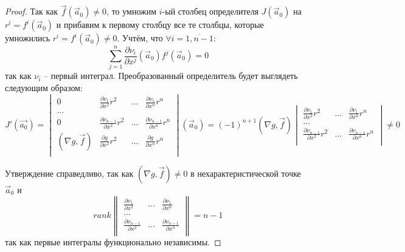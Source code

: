 \begin{proof}
    Так как $\vec{f} \left( \vec{a}_0 \right) \neq 0$, то умножим $i$-ый столбец определителя $J \left( \vec{a}_0 \right)$ на $r^i = f^i \left( \vec{a}_0 \right)$ и прибавим к первому столбцу все те столбцы, которые умножились $r^i = f^i \left( \vec{a}_0 \right) \neq 0$. Учтём, что $\forall i = \overline{1, n - 1}$:
    \begin{equation*}
    	\sum \limits_{j = 1}^n \frac{\partial \nu_i}{\partial x^j} \left( \vec{a}_0 \right) f^j \left( \vec{a}_0 \right) = 0
    \end{equation*}
    так как $\nu_i$ -- первый интеграл. 
    Преобразованный определитель будет выглядеть следующим образом:
    \begin{equation*}
    	J' \left( \vec{a_0} \right) =
    	\begin{vmatrix}
    		0 & \frac{\partial \nu_1}{\partial x^2} r^2 & \dots & \frac{\partial \nu_1}{\partial x^n} r^n                                           \\
    		\dots                                                                                                                                   \\
    		0 & \frac{\partial \nu_{n - 1}}{\partial x^2} r^2 & \dots & \frac{\partial \nu_{n - 1}}{\partial x^n} r^n                               \\
    		\left( \nabla g, \vec{f} \right) & \frac{\partial g}{\partial x^2} r^2 & \dots & \frac{\partial g}{\partial x^n} r^n \\
    	\end{vmatrix}  \left( \vec{a}_0 \right) = \left( -1 \right)^{n + 1} \left( \nabla g, \vec{f} \right)
    	\begin{vmatrix}
    		\frac{\partial \nu_1}{\partial x^2} r^2 & \dots & \frac{\partial \nu_1}{\partial x^n} r^n             \\
    		\dots                                                                                                 \\
    		\frac{\partial \nu_{n - 1}}{\partial x^2} r^2 & \dots & \frac{\partial \nu_{n - 1}}{\partial x^n} r^n \\
    	\end{vmatrix} \neq 0
    \end{equation*}

    Утверждение справедливо, так как $ \left( \nabla g, \vec{f} \right) \neq 0$ в нехарактеристической точке $\vec{a}_0$ и
    \begin{equation*}
    	rank
    	\begin{Vmatrix}
    		\frac{\partial \nu_1}{\partial x^2} & \dots & \frac{\partial \nu_1}{\partial x^n}             \\
    		\dots                                                                                         \\
    		\frac{\partial \nu_{n - 1}}{\partial x^2} & \dots & \frac{\partial \nu_{n - 1}}{\partial x^n} \\
    	\end{Vmatrix} = n - 1
    \end{equation*}
    так как первые интегралы функционально независимы.
    

\end{proof}
